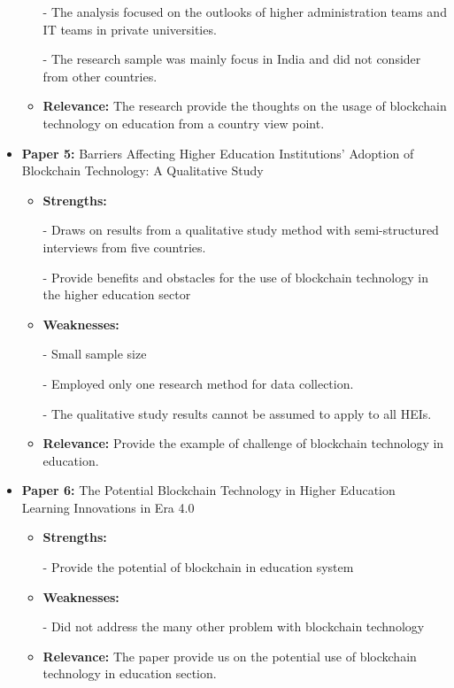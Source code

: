 \documentclass[12pt,a4paper]{article}
\begin{document}
\begin{itemize}
\begin{itemize}
        - The analysis focused on the outlooks of higher administration teams and IT teams in private universities.

        - The research sample was mainly focus in India and did not consider from other countries.
        \item \textbf{Relevance: } The research provide the thoughts on the usage of blockchain technology on education from a country view point.
    \end{itemize}
    \item \textbf{Paper 5:} Barriers Affecting Higher Education Institutions' Adoption of Blockchain Technology: A Qualitative Study
    \begin{itemize}
        \item \textbf{Strengths:} 

        - Draws on results from a qualitative study method with semi-structured interviews from five countries.

        - Provide benefits and obstacles for the use of blockchain technology in the higher education sector
        
        \item \textbf{Weaknesses:} 

        - Small sample size

        - Employed only one research method for data collection.

        - The qualitative study results cannot be assumed to apply to all HEIs.
        \item \textbf{Relevance: } Provide the example of challenge of blockchain technology in education.
    \end{itemize}
    \item \textbf{Paper 6:} The Potential Blockchain Technology in Higher Education Learning Innovations in Era 4.0
    \begin{itemize}
        \item \textbf{Strengths:} 

        - Provide the potential of blockchain in education system
        \item \textbf{Weaknesses:} 

        - Did not address the many other problem with blockchain technology
        \item \textbf{Relevance: } The paper provide us on the potential use of blockchain technology in education section.
    \end{itemize}

\end{itemize}
\end{document}
